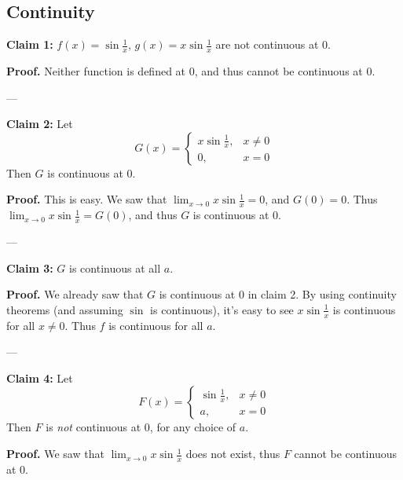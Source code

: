\subsection{Continuity}

\textbf{Claim 1:} $f(x)=\sin \frac{1}{x}$, $g(x)=x\sin \frac{1}{x}$
are not continuous at $0$.

\textbf{Proof.} Neither function is defined at $0$, and thus cannot be
continuous at $0$.

\vs---\vs

\textbf{Claim 2:} Let
\[G(x)=\begin{cases}
  x\sin \frac{1}{x},&x\neq0\\
  0,&x=0
\end{cases}\]
Then $G$ is continuous at $0$. 

\vs

\textbf{Proof.} This is easy. We saw that $\lim_{x\to0}x\sin
\frac{1}{x}=0$, and $G(0)=0$. Thus $\lim_{x\to0}x\sin
\frac{1}{x}=G(0)$, and thus $G$  is continuous at $0$.

\vs---\vs

\textbf{Claim 3:} $G$ is continuous at all $a$.

\textbf{Proof.} We already saw that $G$ is continuous at $0$ in claim
2. By using continuity theorems (and assuming $\sin$ is continuous),
it's easy to see $x\sin \frac{1}{x}$ is continuous for all $x\neq0$. Thus
$f$ is continuous for all $a$.

\vs---\vs

\textbf{Claim 4:} Let
\[F(x)=\begin{cases}
  \sin \frac{1}{x},&x\neq0\\
  a,&x=0
\end{cases}\]
Then $F$ is \textit{not} continuous at $0$, for any choice of $a$.

\vs

\textbf{Proof.} We saw that $\lim_{x\to0}x\sin \frac{1}{x}$ does not
exist, thus $F$ cannot be continuous at $0$.


